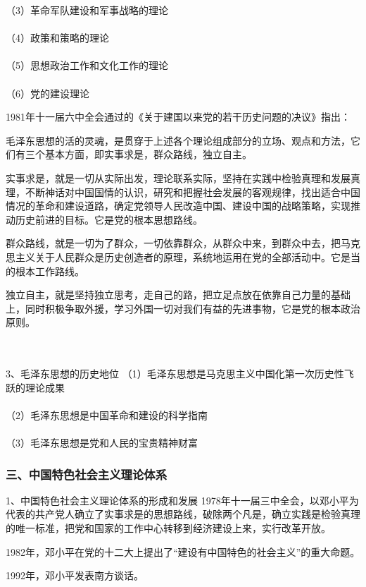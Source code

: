\documentclass{ctexart}
\begin{document}
（3）革命军队建设和军事战略的理论
\\\\

（4）政策和策略的理论
\\\\

（5）思想政治工作和文化工作的理论
\\\\

（6）党的建设理论

1981年十一届六中全会通过的《关于建国以来党的若干历史问题的决议》指出：

毛泽东思想的活的灵魂，是贯穿于上述各个理论组成部分的立场、观点和方法，它们有三个基本方面，即实事求是，群众路线，独立自主。

实事求是，就是一切从实际出发，理论联系实际，坚持在实践中检验真理和发展真理，不断神话对中国国情的认识，研究和把握社会发展的客观规律，找出适合中国情况的革命和建设道路，确定党领导人民改造中国、建设中国的战略策略，实现推动历史前进的目标。它是党的根本思想路线。

群众路线，就是一切为了群众，一切依靠群众，从群众中来，到群众中去，把马克思主义关于人民群众是历史创造者的原理，系统地运用在党的全部活动中。它是当的根本工作路线。

独立自主，就是坚持独立思考，走自己的路，把立足点放在依靠自己力量的基础上，同时积极争取外援，学习外国一切对我们有益的先进事物，它是党的根本政治原则。

\\\\

3、毛泽东思想的历史地位
（1）毛泽东思想是马克思主义中国化第一次历史性飞跃的理论成果
\\\\
（2）毛泽东思想是中国革命和建设的科学指南
\\\\
（3）毛泽东思想是党和人民的宝贵精神财富

\subsubsection{三、中国特色社会主义理论体系}
1、中国特色社会主义理论体系的形成和发展
1978年十一届三中全会，以邓小平为代表的共产党人确立了实事求是的思想路线，破除两个凡是，确立实践是检验真理的唯一标准，把党和国家的工作中心转移到经济建设上来，实行改革开放。

1982年，邓小平在党的十二大上提出了“建设有中国特色的社会主义”的重大命题。

1992年，邓小平发表南方谈话。
\end{document}
